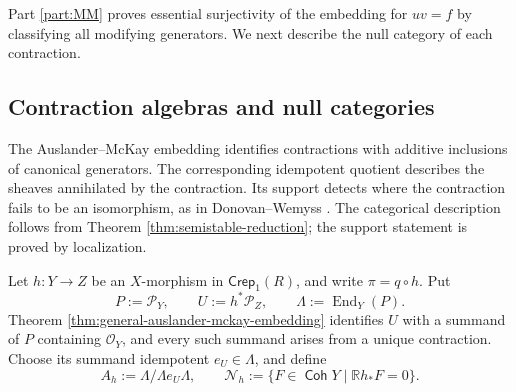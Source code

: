\documentclass[a4paper,reqno]{amsart}
\def\O{\mathcal{O}}
\def\P{\mathcal{P}}
\DeclareMathOperator{\Coh}{\mathsf{Coh}}
\DeclareMathOperator{\End}{End}
\theoremstyle{definition}
\begin{document}
Part \ref{part:MM} proves essential surjectivity of the embedding for $uv=f$ by classifying all modifying generators. We next describe the null category of each contraction.

\subsection{Contraction algebras and null categories}\label{sec:general-contraction-algebras}

The Auslander--McKay embedding identifies contractions with additive inclusions of canonical generators. The corresponding idempotent quotient describes the sheaves annihilated by the contraction. Its support detects where the contraction fails to be an isomorphism, as in Donovan--Wemyss \cite[Theorems 1.2 and 1.4]{DW19contractions}. The categorical description follows from Theorem \ref{thm:semistable-reduction}; the support statement is proved by localization.

Let $h\colon Y\to Z$ be an $X$-morphism in $\mathsf{Crep}_1(R)$, and write $\pi=q\circ h$. Put
\[
P:=\P_Y,\qquad U:=h^*\P_Z,\qquad \Lambda:=\End_Y(P).
\]
Theorem \ref{thm:general-auslander-mckay-embedding} identifies $U$ with a summand of $P$ containing $\O_Y$, and every such summand arises from a unique contraction. Choose its summand idempotent $e_U\in\Lambda$, and define
\begin{equation}\label{eq:general-contraction-algebra}
A_h:=\Lambda/\Lambda e_U\Lambda,\qquad
\mathcal N_h:=\{F\in\Coh Y\mid\mathbb Rh_*F=0\}.
\end{equation}
\end{document}
